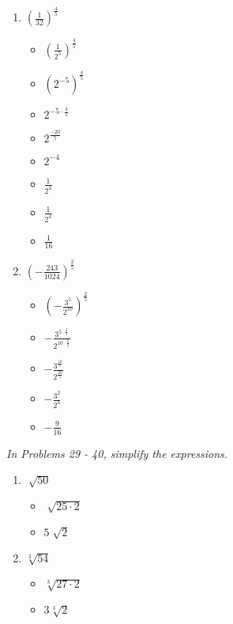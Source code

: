 \documentclass{article}
\begin{document}
\begin{onehalfspace}
\begin{enumerate}[start=15]
        \item $\left( \frac{1}{32} \right)^{\frac{4}{5}}$
        \begin{itemize}
            \item $\left( \frac{1}{2^{5}} \right)^{\frac{4}{5}}$
            \item $\left( 2^{-5} \right)^{\frac{4}{5}}$
            \item $2^{-5 \cdot \frac{4}{5}}$
            \item $2^{\frac{-20}{5}}$
            \item $2^{-4}$
            \item $\frac{1}{2^{4}}$
            \item $\frac{1}{2^{4}}$
            \item $\frac{1}{16}$
        \end{itemize}

        \item $\left( -\frac{243}{1024} \right)^{\frac{2}{5}}$
        \begin{itemize}
            \item $\left( -\frac{3^{5}}{2^{10}} \right)^{\frac{2}{5}}$
            \item $-\frac{3^{5 \cdot \frac{2}{5}}}{2^{10 \cdot \frac{2}{5}}}$
            \item $-\frac{3^{\frac{10}{5}}}{2^{\frac{20}{5}}}$
            \item $-\frac{3^{2}}{2^{4}}$
            \item $-\frac{9}{16}$
        \end{itemize}
    \end{enumerate}

    \textit{In Problems 29 - 40, simplify the expressions.}
    \begin{enumerate}[start=29]
        \item $\sqrt[]{50}$
        \begin{itemize}
            \item $\sqrt[]{25 \cdot 2}$
            \item $5\sqrt[]{2}$
        \end{itemize}

        \item $\sqrt[3]{54}$
        \begin{itemize}
            \item $\sqrt[3]{27 \cdot 2}$
            \item 3$\sqrt[3]{2}$
        \end{itemize}


\end{enumerate}
\end{onehalfspace}
\end{document}
